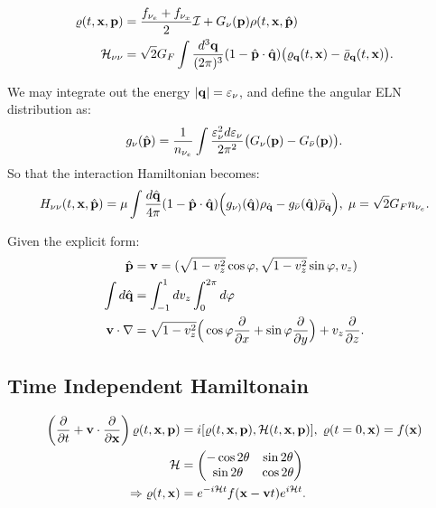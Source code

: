 \documentclass[11pt,a4paper]{article}
\begin{document}
 \begin{align*}
    \varrho(t,\vb{x}, \vb{p}) &= \frac{f_{\nu_{e}} + f_{\nu_{x}}}{2}\mathcal{I} + G_{\nu}(\vb{p}) \rho(t,\vb{x}, \hat{\vb{p}})\\
    \mathcal{H}_{\nu\nu} &= \sqrt{2}G_{F}\int \frac{d^{3}\vb{q}}{(2\pi)^{3}}(1 - \hat{\vb{p}}\cdot \hat{\vb{q}})\big(\varrho_{\vb{q}}(t, \vb{x}) - \bar{\varrho}_{\vb{q}}(t, \vb{x})\big)
 .\end{align*}

 \noindent We may integrate out the energy $\abs{\vb{q}} = \varepsilon_{\nu}$, and define the angular ELN distribution as: 
 \[
 g_{\nu}(\hat{\vb{p}}) = \frac{1}{n_{\nu_{e}}} \int \frac{\varepsilon_{\nu}^{2}d\varepsilon_{\nu}}{2\pi^{2}}\big(G_{\nu}(\vb{p}) - G_{\bar{\nu}}(\vb{p})\big) .\]
 So that the interaction Hamiltonian becomes:
 \[
 H_{\nu\nu}(t, \vb{x}, \hat{\vb{p}}) = \mu \int \frac{d \hat{\vb{q}}}{4\pi}(1 - \hat{\vb{p}} \cdot \hat{\vb{q}}) \Big( g_{\nu)}(\hat{\vb{q}}) \rho_{\hat{\vb{q}}} - g_{\bar{\nu}}(\hat{\vb{q}}) \bar{\rho}_{\hat{\vb{q}}} \Big) ,  \hspace{0.1cm}\mu = \sqrt{2}G_{F}n_{\nu_{e}} .\] 

\noindent Given the explicit form:
\begin{align*}
   \hat{\vb{p}} &= \vb{v} = (\sqrt{1-v_{z}^{2}}\cos \varphi,  \sqrt{1-v_{z}^{2}}\sin \varphi, v_{z})\\ 
   \int d\hat{\vb{q}} &= \int _{-1}^{1}dv_{z}\int_{0}^{2\pi} d\varphi\\
   \vb{v} \cdot \nabla &= \sqrt{1-v_{z}^{2}} \Big(\cos \varphi \frac{\partial}{\partial x} + \sin\varphi \frac{\partial}{\partial y} \Big) + v_{z} \frac{\partial}{\partial z} 
.\end{align*}



\subsection{Time Independent Hamiltonain}%
\label{sub:Time Independent Hamiltonain}
\begin{align*}
   \left(  \frac{\partial}{\partial t} + \vb{v}\cdot \frac{\partial}{\partial \vb{x}} \right) \varrho(t,\vb{x}, \vb{p}) &= i \comm{\varrho (t, \vb{x}, \vb{p})}{\mathcal{H}(t, \vb{x}, \vb{p})} , \hspace{0.1cm}\varrho(t=0,\vb{x}) = f(\vb{x})\\
   \mathcal{H} &= \begin{pmatrix}
 -\cos 2\theta & \sin 2\theta\\
\sin 2\theta & \cos 2\theta \\
\end{pmatrix}\\
      \Rightarrow \varrho(t,\vb{x}) &= e^{-i\mathcal{H}t}f(\vb{x} - \vb{v}t)e^{i\mathcal{H}t} 
.\end{align*}
\end{document}

